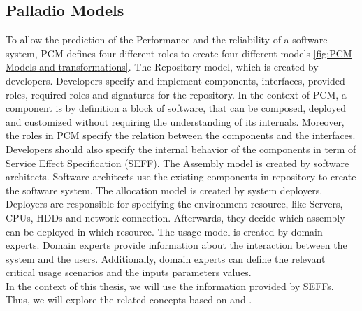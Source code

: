 \subsection{Palladio Models}
\label{sec: Palladio Models}
To allow the prediction of the Performance and the reliability of a software system, PCM defines four different roles to create four different models \ref{fig:PCM Models and transformations}. The Repository model, which is created by developers. Developers specify and implement components, interfaces, provided roles, required roles and signatures for the repository. In the context of PCM, a component is by definition a block of software, that can be composed, deployed and customized without requiring the understanding of its internals.  Moreover, the roles in PCM specify the relation between the components and the interfaces. Developers should also specify the internal behavior of the components in term of Service Effect Specification (SEFF). The Assembly model is created by software architects. Software architects use the existing components in repository to create the software system. The allocation model is created by system deployers.  Deployers are responsible for specifying the environment resource, like Servers, CPUs, HDDs and network connection. Afterwards, they decide which assembly can be deployed in which resource. The usage model is created by domain experts. Domain experts provide information about the interaction between the system and the users. Additionally, domain experts can define the relevant critical usage scenarios and the inputs parameters values. \\

In the context of this thesis, we will use the information provided by SEFFs. Thus, we will explore the related concepts based on \cite{becker2009palladio} and \cite{koziolek2006parameter}.


